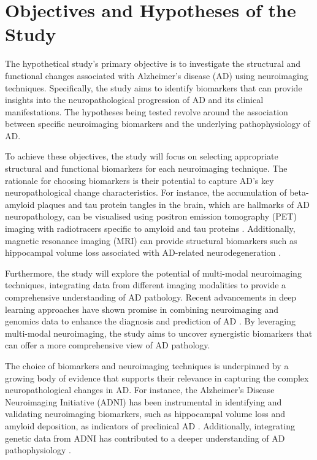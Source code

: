 \documentclass[10pt]{article}
\begin{document}
\begin{sloppypar}
  \section{Objectives and Hypotheses of the Study}
  \label{sec:objectives-and-hypotheses}

  The hypothetical study's primary objective is to investigate the structural and functional changes associated with Alzheimer's disease (AD) using neuroimaging techniques. Specifically, the study aims to identify biomarkers that can provide insights into the neuropathological progression of AD and its clinical manifestations. The hypotheses being tested revolve around the association between specific neuroimaging biomarkers and the underlying pathophysiology of AD.

  To achieve these objectives, the study will focus on selecting appropriate structural and functional biomarkers for each neuroimaging technique. The rationale for choosing biomarkers is their potential to capture AD's key neuropathological change characteristics. For instance, the accumulation of beta-amyloid plaques and tau protein tangles in the brain, which are hallmarks of AD neuropathology, can be visualised using positron emission tomography (PET) imaging with radiotracers specific to amyloid and tau proteins \citep{bao_pet_2021}. Additionally, magnetic resonance imaging (MRI) can provide structural biomarkers such as hippocampal volume loss associated with AD-related neurodegeneration \citep{besson_cognitive_2015}.

  Furthermore, the study will explore the potential of multi-modal neuroimaging techniques, integrating data from different imaging modalities to provide a comprehensive understanding of AD pathology. Recent advancements in deep learning approaches have shown promise in combining neuroimaging and genomics data to enhance the diagnosis and prediction of AD \citep{lin_deep_2021}. By leveraging multi-modal neuroimaging, the study aims to uncover synergistic biomarkers that can offer a more comprehensive view of AD pathology.

  The choice of biomarkers and neuroimaging techniques is underpinned by a growing body of evidence that supports their relevance in capturing the complex neuropathological changes in AD. For instance, the Alzheimer's Disease Neuroimaging Initiative (ADNI) has been instrumental in identifying and validating neuroimaging biomarkers, such as hippocampal volume loss and amyloid deposition, as indicators of preclinical AD \citep{saykin_genetic_2015}. Additionally, integrating genetic data from ADNI has contributed to a deeper understanding of AD pathophysiology \citep{saykin_genetic_2015}.


\end{sloppypar}
\end{document}
